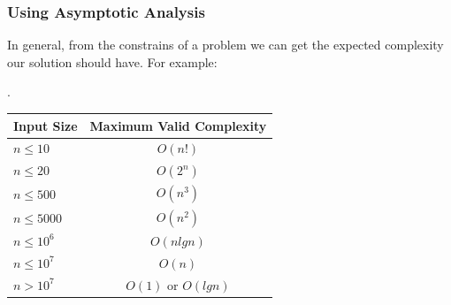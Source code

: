 \documentclass{beamer}
\begin{document}
\begin{frame}
	\frametitle{Using Asymptotic Analysis}

	In general, from the constrains of a problem we can get the expected complexity our solution should have. For example:

	\begin{table}[]
		\bgroup
		\setlength\tabcolsep{10pt}.
		\begin{tabular}{l|c}
			\multicolumn{1}{c|}{\textbf{Input Size}} & \multicolumn{1}{c}{\textbf{Maximum Valid Complexity}} \\ \hline
			$n \leq 10$ & $O(n!)$ \\
			$n \leq 20$ & $O(2^n)$ \\
			$n \leq 500$ & $O(n^3)$ \\
			$n \leq 5000$ & $O(n^2)$ \\
			$n \leq 10^6$ & $O(nlgn)$ \\
			$n \leq 10^7$ & $O(n)$ \\
			$n > 10^7$ & $O(1)$ or $O(lgn)$
		\end{tabular}
		\egroup
	\end{table}
\end{frame}
\end{document}
